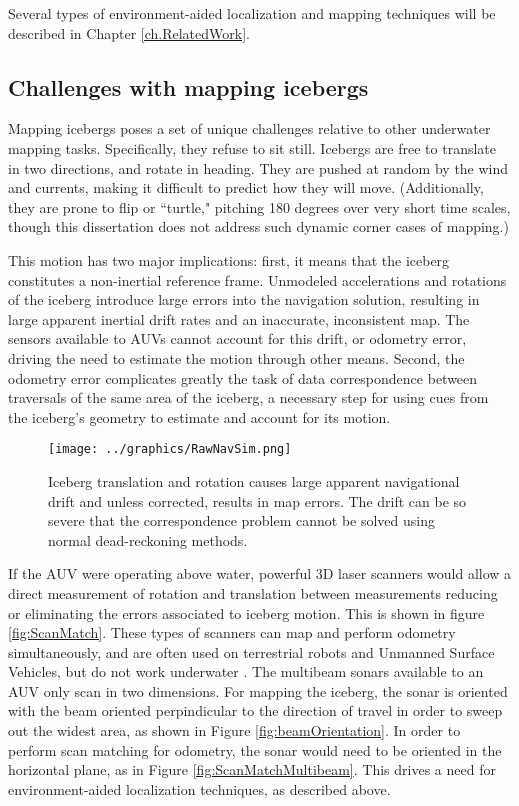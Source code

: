 Several types of environment-aided localization and mapping techniques will be described in Chapter \ref{ch.RelatedWork}.

\subsection{Challenges with mapping icebergs}

Mapping icebergs poses a set of unique challenges relative to other underwater mapping tasks. Specifically, they refuse to sit still. Icebergs are free to translate in two directions, and rotate in heading. They are pushed at random by the wind  and currents, making it difficult to predict how they will move. (Additionally, they are prone to flip or ``turtle," pitching 180 degrees over very short time scales, though this dissertation does not address such dynamic corner cases of mapping.) 

This motion has two major implications: first, it means that the iceberg constitutes a non-inertial reference frame. Unmodeled accelerations and rotations of the iceberg introduce large errors into the navigation solution, resulting in large apparent inertial drift rates and an inaccurate, inconsistent map. The sensors available to AUVs cannot account for this drift, or odometry error, driving the need to estimate the motion through other means. Second, the odometry error complicates greatly the task of data correspondence between traversals of the same area of the iceberg, a necessary step for using cues from the iceberg's geometry to estimate and account for its motion.

\begin{figure}[htbp]
   \centering
   \texttt{[image: ../graphics/RawNavSim.png]} %
   \caption{Iceberg translation and rotation causes large apparent navigational drift and unless corrected, results in map errors. The drift can be so severe that the correspondence problem cannot be solved using normal dead-reckoning methods.}
   \label{fig:naiveMapping}
\end{figure}

If the AUV were operating above water, powerful 3D laser scanners would allow a direct measurement of rotation and translation between measurements reducing or eliminating the errors associated to iceberg motion. This is shown in figure \ref{fig:ScanMatch}. These types of scanners can map and perform odometry simultaneously, and are often used on terrestrial robots and Unmanned Surface Vehicles, but do not work underwater \cite{ref:Singapore}. The multibeam sonars available to an AUV only scan in two dimensions. For mapping the iceberg, the sonar is oriented with the beam oriented perpindicular to the direction of travel in order to sweep out the widest area, as shown in Figure \ref{fig:beamOrientation}.  In order to perform scan matching for odometry, the sonar would need to be oriented in the horizontal plane, as in Figure \ref{fig:ScanMatchMultibeam}. This drives a need for environment-aided localization techniques, as described above. 

